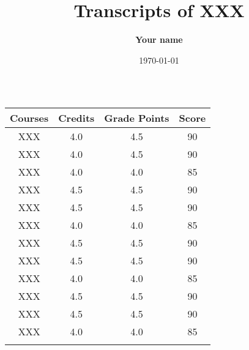 \documentclass[11pt,a4paper]{article}
\begin{document}
\title{\vspace{-15mm}\fontsize{21pt}{10pt}\selectfont\textbf{Transcripts of XXX}}
\large
\author{\textbf{Your name}}
\date{\today}
\maketitle
\thispagestyle{empty}
\begin{table}[!htbp]
\small
\centering
\begin{tabular}{cccc}
\Xhline{1.5pt}
\textbf{Courses}	&	\textbf{Credits}	&	\textbf{Grade Points} 	&	\textbf{Score}	\\\hline
\hline
XXX	&	4.0   	&	4.5 	&	90	\\\hline
XXX	&	4.0   	&	4.5 	&	90	\\\hline
XXX	&	4.0 	&	4.0 	&	85	\\\hline
XXX	&	4.5 	&	4.5 	&	90	\\\hline
XXX	&	4.5 	&	4.5 	&	90	\\\hline
XXX	&	4.0 	&	4.0 	&	85	\\\hline
XXX	&	4.5 	&	4.5 	&	90	\\\hline
XXX	&	4.5 	&	4.5 	&	90	\\\hline
XXX	&	4.0 	&	4.0 	&	85	\\\hline
XXX	&	4.5 	&	4.5 	&	90	\\\hline
XXX	&	4.5 	&	4.5 	&	90	\\\hline
XXX	&	4.0 	&	4.0 	&	85	\\
\Xhline{1.5pt}
\end{tabular}
\caption*{}
\end{table}
\end{document}

